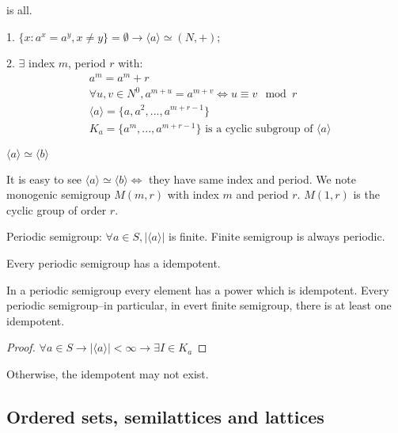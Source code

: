\begin{Them} is all.

    1. $\{x:a^x=a^y,x\neq y\} = \emptyset \rightarrow \langle a\rangle \simeq (N,+)$;

    2. $\exists$ index $m$, period $r$ with:
    \begin{align*}
        &a^m=a^m+r   \\
        &\forall u,v \in N^0, a^{m+u}=a^{m+v} \Leftrightarrow u \equiv v \mod{r}    \\
        &\langle a\rangle =\{a,a^2,...,a^{m+r-1}\}  \\
        &K_a=\{a^m,...,a^{m+r-1}\} \text{ is a cyclic subgroup of }\langle a\rangle
    \end{align*}
\end{Them}

\begin{Rmk}$\langle a\rangle \simeq \langle b\rangle$

    It is easy to see $\langle a\rangle \simeq \langle b\rangle \Leftrightarrow $ they have same index and period.
    We note monogenic semigroup $M(m,r)$ with index $m$ and period $r$.
    $M(1,r)$ is the cyclic group of order $r$.

    Periodic semigroup: $\forall a \in S, |\langle a \rangle|$ is finite.
    Finite semigroup is always periodic.
\end{Rmk}

\begin{Prop}Every periodic semigroup has a idempotent.
    
    In a periodic semigroup every element has a power which is idempotent. 
    Every periodic semigroup--in particular, in evert finite semigroup, there is at least one idempotent.
    \begin{proof}
        $\forall a \in S \rightarrow |\langle a\rangle| < \infty\rightarrow \exists I \in K_a$
    \end{proof}
    Otherwise, the idempotent may not exist.
\end{Prop}

\subsection[3]{Ordered sets, semilattices and lattices}


